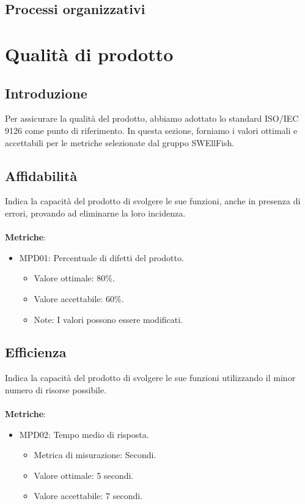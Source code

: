 \documentclass[12pt]{article}
\begin{document}
\subsection{Processi organizzativi}

\section{Qualità di prodotto}
\subsection{Introduzione}
Per assicurare la qualità del prodotto, abbiamo adottato lo standard ISO/IEC 9126 come punto di riferimento. In questa sezione, forniamo i valori ottimali e accettabili per le metriche selezionate dal gruppo SWEllFish.



\subsection{Affidabilità}
	Indica la capacità del prodotto di svolgere le sue funzioni, anche in presenza di errori, provando ad eliminarne la loro incidenza.
	\\\\
	\textbf{Metriche}:
	\begin{itemize}
		\item MPD01: Percentuale di difetti del prodotto.
		\begin{itemize}	
			\item Valore ottimale: 80\%.
			\item Valore accettabile: 60\%.
			\item Note: I valori possono essere modificati.
		\end{itemize}
	\end{itemize}


\subsection{Efficienza}
	Indica la capacità del prodotto di svolgere le sue funzioni utilizzando il minor numero di risorse possibile.
	\\\\
	\textbf{Metriche}:
	\begin{itemize}
		\item MPD02: Tempo medio di risposta.
		\begin{itemize}	
			\item Metrica di misurazione: Secondi.
			\item Valore ottimale: 5 secondi.
			\item Valore accettabile: 7 secondi.
		\end{itemize}
	\end{itemize}
\end{document}
